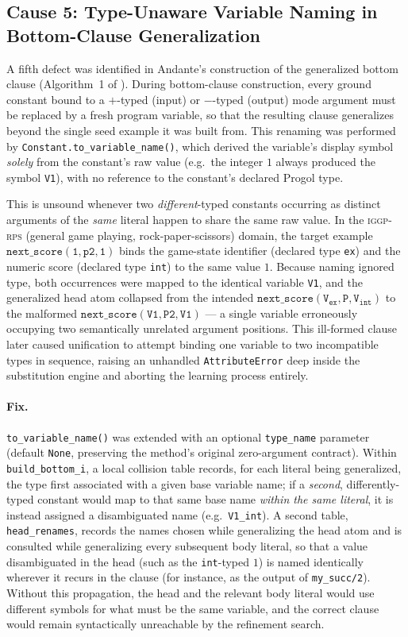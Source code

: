 \subsection{Cause 5: Type-Unaware Variable Naming in Bottom-Clause Generalization}
\label{sec:andante-cause5}

A fifth defect was identified in Andante's construction of the generalized
bottom clause (Algorithm~1 of \citet{muggleton1995inverse}). During
bottom-clause construction, every ground constant bound to a $+$-typed
(input) or $-$-typed (output) mode argument must be replaced by a fresh
program variable, so that the resulting clause generalizes beyond the
single seed example it was built from. This renaming was performed by
\texttt{Constant.to\_variable\_name()}, which derived the variable's
display symbol \emph{solely} from the constant's raw value (e.g.\ the
integer $1$ always produced the symbol \texttt{V1}), with no reference to
the constant's declared Progol type.

This is unsound whenever two \emph{different}-typed constants occurring
as distinct arguments of the \emph{same} literal happen to share the same
raw value. In the \textsc{iggp-rps} (general game playing, rock-paper-scissors)
domain, the target example
$\mathtt{next\_score(1, p2, 1)}$ binds the game-state identifier
(declared type \texttt{ex}) and the numeric score (declared type
\texttt{int}) to the same value $1$. Because naming ignored type, both
occurrences were mapped to the identical variable \texttt{V1}, and the
generalized head atom collapsed from the intended
$\mathtt{next\_score(V_{ex}, P, V_{int})}$ to the malformed
$\mathtt{next\_score(V1, P2, V1)}$ — a single variable erroneously
occupying two semantically unrelated argument positions. This
ill-formed clause later caused unification to attempt binding one
variable to two incompatible types in sequence, raising an unhandled
\texttt{AttributeError} deep inside the substitution engine and aborting
the learning process entirely.

\paragraph{Fix.} \texttt{to\_variable\_name()} was extended with an
optional \texttt{type\_name} parameter (default \texttt{None}, preserving
the method's original zero-argument contract). Within
\texttt{build\_bottom\_i}, a local collision table records, for each
literal being generalized, the type first associated with a given base
variable name; if a \emph{second}, differently-typed constant would map
to that same base name \emph{within the same literal}, it is instead
assigned a disambiguated name (e.g.\ \texttt{V1\_int}). A second table,
\texttt{head\_renames}, records the names chosen while generalizing the
head atom and is consulted while generalizing every subsequent body
literal, so that a value disambiguated in the head (such as the
\texttt{int}-typed $1$) is named identically wherever it recurs in the
clause (for instance, as the output of \texttt{my\_succ/2}). Without this
propagation, the head and the relevant body literal would use different
symbols for what must be the same variable, and the correct clause would
remain syntactically unreachable by the refinement search.

